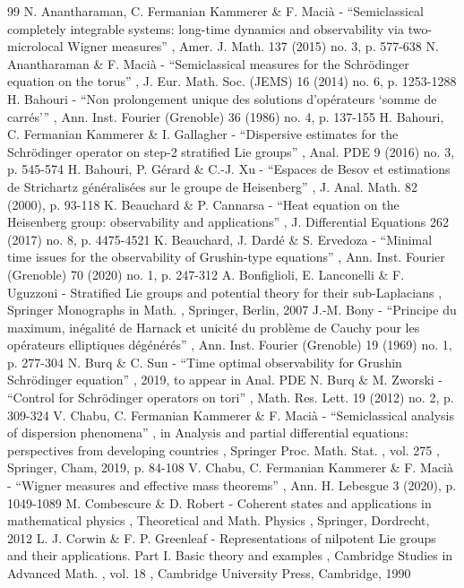\begin{thebibliography}{99}
 N. Anantharaman, C. Fermanian Kammerer \& F. Macià - “Semiclassical completely integrable systems: long-time dynamics and observability via two-microlocal Wigner measures” , Amer. J. Math. 137 (2015) no. 3, p. 577-638
 N. Anantharaman \& F. Macià - “Semiclassical measures for the Schrödinger equation on the torus” , J. Eur. Math. Soc. (JEMS) 16 (2014) no. 6, p. 1253-1288
 H. Bahouri - “Non prolongement unique des solutions d’opérateurs ‘somme de carrés’” , Ann. Inst. Fourier (Grenoble) 36 (1986) no. 4, p. 137-155
 H. Bahouri, C. Fermanian Kammerer \& I. Gallagher - “Dispersive estimates for the Schrödinger operator on step-2 stratified Lie groups” , Anal. PDE 9 (2016) no. 3, p. 545-574
 H. Bahouri, P. Gérard \& C.-J. Xu - “Espaces de Besov et estimations de Strichartz généralisées sur le groupe de Heisenberg” , J. Anal. Math. 82 (2000), p. 93-118
 K. Beauchard \& P. Cannarsa - “Heat equation on the Heisenberg group: observability and applications” , J. Differential Equations 262 (2017) no. 8, p. 4475-4521
 K. Beauchard, J. Dardé \& S. Ervedoza - “Minimal time issues for the observability of Grushin-type equations” , Ann. Inst. Fourier (Grenoble) 70 (2020) no. 1, p. 247-312
 A. Bonfiglioli, E. Lanconelli \& F. Uguzzoni - Stratified Lie groups and potential theory for their sub-Laplacians , Springer Monographs in Math. , Springer, Berlin, 2007
 J.-M. Bony - “Principe du maximum, inégalité de Harnack et unicité du problème de Cauchy pour les opérateurs elliptiques dégénérés” , Ann. Inst. Fourier (Grenoble) 19 (1969) no. 1, p. 277-304
 N. Burq \& C. Sun - “Time optimal observability for Grushin Schrödinger equation” , 2019, to appear in Anal. PDE
 N. Burq \& M. Zworski - “Control for Schrödinger operators on tori” , Math. Res. Lett. 19 (2012) no. 2, p. 309-324
 V. Chabu, C. Fermanian Kammerer \& F. Macià - “Semiclassical analysis of dispersion phenomena” , in Analysis and partial differential equations: perspectives from developing countries , Springer Proc. Math. Stat. , vol. 275 , Springer, Cham, 2019, p. 84-108
 V. Chabu, C. Fermanian Kammerer \& F. Macià - “Wigner measures and effective mass theorems” , Ann. H. Lebesgue 3 (2020), p. 1049-1089
 M. Combescure \& D. Robert - Coherent states and applications in mathematical physics , Theoretical and Math. Physics , Springer, Dordrecht, 2012
 L. J. Corwin \& F. P. Greenleaf - Representations of nilpotent Lie groups and their applications. Part I. Basic theory and examples , Cambridge Studies in Advanced Math. , vol. 18 , Cambridge University Press, Cambridge, 1990

\end{thebibliography}
